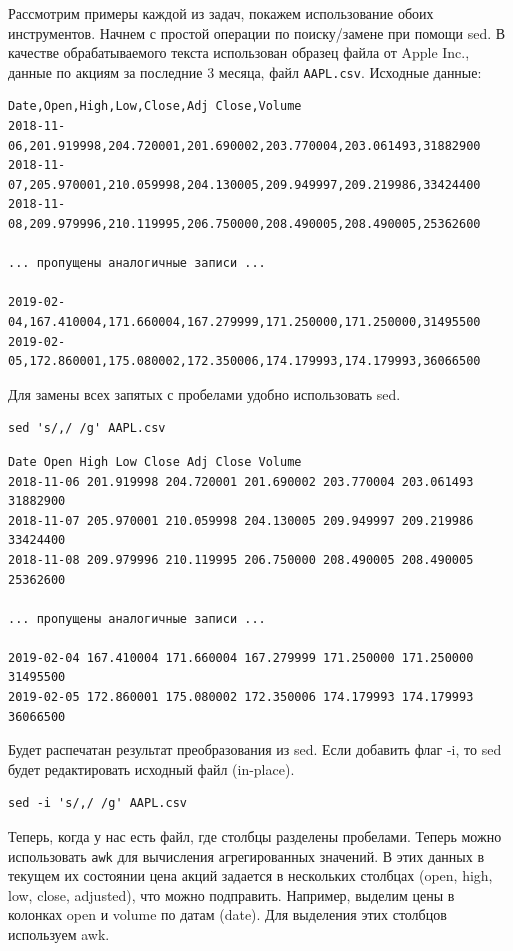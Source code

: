 \documentclass[12pt]{article}
\begin{document}
Рассмотрим примеры каждой из задач, покажем использование обоих
инструментов. Начнем с простой операции по поиску/замене при помощи sed.
В качестве обрабатываемого текста использован образец файла от Apple
Inc., данные по акциям за последние 3 месяца, файл \texttt{AAPL.csv}.
Исходные данные:

\begin{verbatim}
Date,Open,High,Low,Close,Adj Close,Volume
2018-11-06,201.919998,204.720001,201.690002,203.770004,203.061493,31882900
2018-11-07,205.970001,210.059998,204.130005,209.949997,209.219986,33424400
2018-11-08,209.979996,210.119995,206.750000,208.490005,208.490005,25362600

... пропущены аналогичные записи ...

2019-02-04,167.410004,171.660004,167.279999,171.250000,171.250000,31495500
2019-02-05,172.860001,175.080002,172.350006,174.179993,174.179993,36066500
\end{verbatim}

Для замены всех запятых с пробелами удобно использовать sed.

\begin{verbatim}
sed 's/,/ /g' AAPL.csv
\end{verbatim}

\begin{verbatim}
Date Open High Low Close Adj Close Volume
2018-11-06 201.919998 204.720001 201.690002 203.770004 203.061493 31882900
2018-11-07 205.970001 210.059998 204.130005 209.949997 209.219986 33424400
2018-11-08 209.979996 210.119995 206.750000 208.490005 208.490005 25362600

... пропущены аналогичные записи ...

2019-02-04 167.410004 171.660004 167.279999 171.250000 171.250000 31495500
2019-02-05 172.860001 175.080002 172.350006 174.179993 174.179993 36066500
\end{verbatim}

Будет распечатан результат преобразования из sed. Если добавить флаг -i,
то sed будет редактировать исходный файл (in-place).

\begin{verbatim}
sed -i 's/,/ /g' AAPL.csv
\end{verbatim}

Теперь, когда у нас есть файл, где столбцы разделены пробелами. Теперь
можно использовать \texttt{awk} для вычисления агрегированных значений.
В этих данных в текущем их состоянии цена акций задается в нескольких
столбцах (open, high, low, close, adjusted), что можно подправить.
Например, выделим цены в колонках open и volume по датам (date). Для
выделения этих столбцов используем awk.
\end{document}
